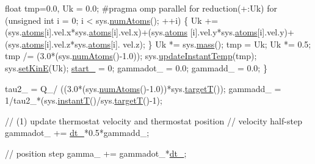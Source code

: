 \begin{DoxyCode}
        \textcolor{keywordtype}{float} tmp=0.0, Uk = 0.0;
\textcolor{preprocessor}{        #pragma omp parallel for reduction(+:Uk)}
\textcolor{preprocessor}{}        \textcolor{keywordflow}{for} (\textcolor{keywordtype}{unsigned} \textcolor{keywordtype}{int} i = 0; i < sys.\hyperlink{classsystem_definition_ae8d3c2df2d56241cee03fcc4e2026ae0}{numAtoms}(); ++i) \{
            Uk += (sys.\hyperlink{classsystem_definition_ae8814d3f60fc1111af2a3f218a4bfcab}{atoms}[i].vel.x*sys.\hyperlink{classsystem_definition_ae8814d3f60fc1111af2a3f218a4bfcab}{atoms}[i].vel.x)+(sys.\hyperlink{classsystem_definition_ae8814d3f60fc1111af2a3f218a4bfcab}{atoms}
      [i].vel.y*sys.\hyperlink{classsystem_definition_ae8814d3f60fc1111af2a3f218a4bfcab}{atoms}[i].vel.y)+(sys.\hyperlink{classsystem_definition_ae8814d3f60fc1111af2a3f218a4bfcab}{atoms}[i].vel.z*sys.\hyperlink{classsystem_definition_ae8814d3f60fc1111af2a3f218a4bfcab}{atoms}[i].
      vel.z);
        \}
        Uk *= sys.\hyperlink{classsystem_definition_acb6dd3df121e3e5bc0eb41c32bd937bd}{mass}();
        tmp = Uk;
        Uk *= 0.5;
        tmp /= (3.0*(sys.\hyperlink{classsystem_definition_ae8d3c2df2d56241cee03fcc4e2026ae0}{numAtoms}()-1.0));
        sys.\hyperlink{classsystem_definition_a285e6cd1de35ed125eecb20f0f774ab3}{updateInstantTemp}(tmp);
        sys.\hyperlink{classsystem_definition_a2b2c236698886bd1d106be802b987b61}{setKinE}(Uk);
        \hyperlink{classintegrator_a5b3546a765d8a83b6db8a6d890ace480}{start\_} = 0;
        gammadot\_ = 0.0;
        gammadd\_ = 0.0;
    \}
    
    tau2\_ = Q\_/ ((3.0*(sys.\hyperlink{classsystem_definition_ae8d3c2df2d56241cee03fcc4e2026ae0}{numAtoms}()-1.0))*sys.\hyperlink{classsystem_definition_a3c958df2ab99c0cb75c740346a5a4b6f}{targetT}());
    gammadd\_ = 1/tau2\_*(sys.\hyperlink{classsystem_definition_af7b322cfc8abe7042fdbeb0af8e7aa7e}{instantT}()/sys.\hyperlink{classsystem_definition_a3c958df2ab99c0cb75c740346a5a4b6f}{targetT}()-1);
    
    \textcolor{comment}{// (1) update thermostat velocity and thermostat position}
    \textcolor{comment}{// velocity half-step}
    gammadot\_ += \hyperlink{classintegrator_a6e4712b8597e3c40124316d2e9dd5051}{dt\_}*0.5*gammadd\_;
    
    \textcolor{comment}{// position step}
    gamma\_ += gammadot\_*\hyperlink{classintegrator_a6e4712b8597e3c40124316d2e9dd5051}{dt\_};
    

\end{DoxyCode}
